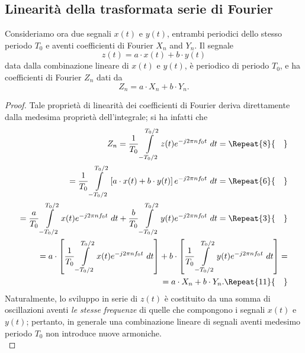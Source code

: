 \documentclass[12pt,oneside,openany]{memoir}
\numberwithin{equation}{subsection}
\newcommand{\quads}[1]{\Repeat{#1}{\quad}}
\newcommand{\dt}{\ dt}
\begin{document}

\newpage
\subsection{Linearit\`a della trasformata serie di Fourier}
Consideriamo ora due segnali $x(t)$ e $y(t)$, entrambi periodici dello stesso
periodo $T_0$ e aventi coefficienti di Fourier $X_n$ and $Y_n$. Il segnale
\begin{equation}
	z(t) = a \cdot x(t) + b \cdot y(t)
\end{equation}
data dalla combinazione lineare di $x(t)$ e $y(t)$, \`e periodico di periodo
$T_0$, e ha coefficienti di Fourier $Z_n$ dati da
\begin{equation}
	Z_n = a \cdot X_n + b \cdot Y_n.
\end{equation}
\begin{proof}
Tale propriet\`a di linearit\`a dei coefficienti di Fourier deriva direttamente
	dalla medesima propriet\`a dell'integrale; si ha infatti che
\begin{equation}
\begin{split}
	Z_n = \frac{1}{T_0} \int\displaylimits_{-T_0/2}^{T_0/2} z(t)
	e^{-j 2 \pi n f_0 t} \dt =
	\quads{8}
	\\
	= \frac{1}{T_0} \int\displaylimits_{-T_0/2}^{T_0/2} \left[a \cdot x(t) +
	b \cdot y(t)\right] e^{-j 2 \pi n f_0 t} \dt =
	\quads{6}
	\\
	= \frac{a}{T_0} \int\displaylimits_{-T_0/2}^{T_0/2} x(t)
	e^{-j 2 \pi n f_0 t} \dt + \frac{b}{T_0}
	\int\displaylimits_{-T_0/2}^{T_0/2} y(t) e^{-j 2 \pi n f_0 t} \dt =
	\quads{3}
	\\
	= a \cdot \left[\frac{1}{T_0} \int\displaylimits_{-T_0/2}^{T_0/2} x(t)
	e^{-j 2 \pi n f_0 t} \dt \right] + b \cdot \left[\frac{1}{T_0}
	\int\displaylimits_{-T_0/2}^{T_0/2} y(t) e^{-j 2 \pi n f_0 t}
	\dt \right] =
	\\
	= a \cdot X_n + b \cdot Y_n.
	\quads{11}
\end{split}
\end{equation}
Naturalmente, lo sviluppo in serie di $z(t)$ \`e costituito da una somma di
oscillazioni aventi \textit{le stesse frequenze} di quelle che compongono i
segnali $x(t)$ e $y(t)$; pertanto, in generale una combinazione lineare di
segnali aventi medesimo periodo $T_0$ non introduce nuove armoniche.\\
\end{proof}
\end{document}
